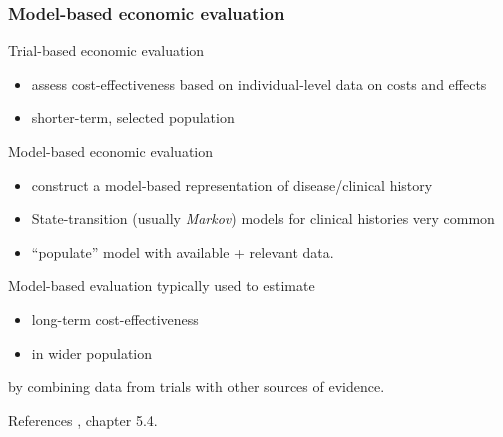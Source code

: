 \begin{frame}

\frametitle{Model-based economic evaluation}

\bi

\item Trial-based economic evaluation
  \begin{itemize}
  \item assess cost-effectiveness based on individual-level data on
    costs and effects
  \item shorter-term, selected population
  \end{itemize}

\item Model-based economic evaluation
  \begin{itemize}
  \item construct a model-based representation of disease/clinical
    history
  \item State-transition (usually \emph{Markov}) models for clinical
  histories very common
  \item ``populate'' model with available + relevant data.
  \end{itemize}

\item Model-based evaluation typically used to estimate
  \begin{itemize}
  \item \alert{long-term} cost-effectiveness
  \item in wider population 
  \end{itemize}
  by combining data from trials with other sources of evidence.

\ei

\vfill 
\begin{block}{\footnotesize References}
\bmhe,  chapter 5.4.\\
\esdmh
\end{block}
\end{frame}




